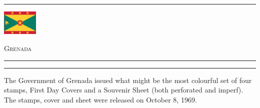 \documentclass[a4paper]{article}
\begin{document}
\hrule
\vspace{8pt}
\begin{minipage}{2cm}
  \includegraphics[height=1.2cm]{images/gd}
\end{minipage}
\hfill
{\scshape\huge Grenada}
\vspace{8pt}
\hrule
\vspace{15cm}
\begin{center}
  \begin{minipage}{10cm}
    \hrule \vspace{12pt} The Government of Grenada issued what might
    be the most colourful set of four stamps, First Day Covers and a
    Souvenir Sheet (both perforated and imperf). The stamps, cover
    and sheet were released on October 8, 1969.
  \end{minipage}
\end{center}
\end{document}

